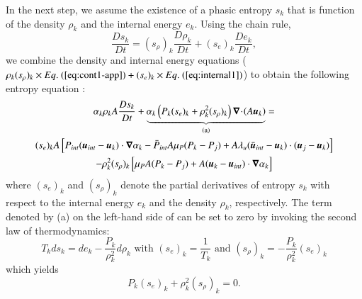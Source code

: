 \documentclass[preprint,10pt]{elsarticle}
\begin{document}
\begin{appendices}
In the next step, we assume the existence of a phasic entropy $s_k$ that is function of the density $\rho_k$ and the  internal energy $e_k$. Using the chain rule, 
\begin{equation}
\frac{Ds_k}{Dt} = (s_\rho)_k \frac{D \rho_k}{Dt} + (s_e)_k \frac{De_k}{Dt},
\end{equation}
we combine the density and internal energy equations ($\rho_k (s_\rho)_k \times \eqt{eq:cont1-app}  + (s_e)_k \times \eqt{eq:internal1}$) to obtain  the following entropy equation :
\begin{multline}
\label{eq:ent1}
\alpha_k \rho_k A \frac{Ds_k}{Dt} + 
\underbrace{\alpha_k \left( P_k (s_e)_k + \rho_k^2 (s_\rho)_k \right)  \boldsymbol\nabla\! \cdot \! \left( A \boldsymbol u_k \right) }_\textrm{(a)} = \\
(s_e)_k A \left[ P_{int}(\boldsymbol u_{int}-\boldsymbol u_k)\cdot \boldsymbol\nabla \alpha_k - \bar{P}_{int} A \mu_P (P_k-P_j) + A \lambda_u (\bar{\boldsymbol u}_{int}-\boldsymbol u_k) \cdot (\boldsymbol u_j-\boldsymbol u_k)\right] \\
- \rho_k^2 (s_\rho)_k \left[ \mu_P A (P_k-P_j) + A(\boldsymbol u_k-\boldsymbol u_{int}) \cdot \boldsymbol\nabla \alpha_k\right] 
\end{multline}
where $(s_e)_k$ and $(s_\rho)_k$ denote the partial derivatives of entropy $s_k$ with respect to the internal energy $e_k$ and the density $\rho_k$, respectively.
The term denoted by (a) on the left-hand side of  can be set to zero by invoking the second law of thermodynamics:
\begin{equation}
T_k ds_k = de_k - \frac{P_k}{\rho_k^2} d \rho_k \text{ with } (s_e)_k = \frac{1}{T_k} \text{ and } (s_\rho)_k = - \frac{P_k}{\rho_k^2} (s_e)_k
\end{equation}
which yields
\begin{equation}
\label{eq:ent2}
 P_k (s_e)_k + \rho_k^2 (s_\rho)_k = 0 .
\end{equation} 


\end{appendices}
\end{document}
